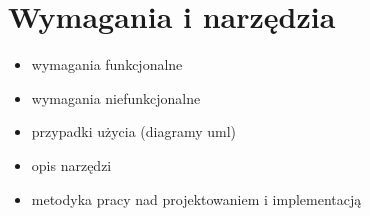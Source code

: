 \chapter {Wymagania i narzędzia} 
{
    \begin{itemize}
       \item wymagania funkcjonalne
       \item wymagania niefunkcjonalne
       \item przypadki użycia (diagramy uml)
       \item opis narzędzi
       \item metodyka pracy nad projektowaniem i implementacją  
    \end{itemize}
}